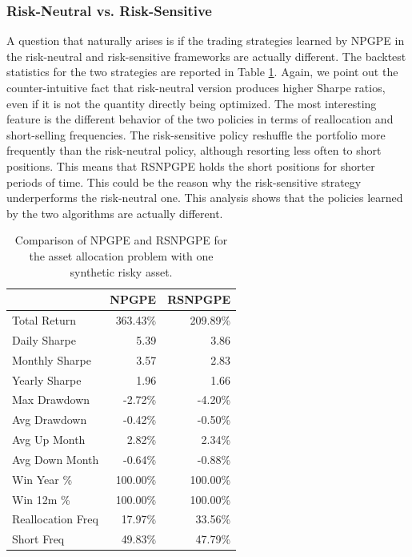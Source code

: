 \subsubsection{Risk-Neutral vs. Risk-Sensitive}
A question that naturally arises is if the trading strategies learned by \gls{NPGPE} in the risk-neutral and risk-sensitive frameworks are actually different. The backtest statistics for the two strategies are reported in Table \ref{tab:comparison_NPGPE}. Again, we point out the counter-intuitive fact that risk-neutral version produces higher Sharpe ratios, even if it is not the quantity directly being optimized. The most interesting feature is the different behavior of the two policies in terms of reallocation and short-selling frequencies. The risk-sensitive policy reshuffle the portfolio more frequently than the risk-neutral policy, although resorting less often to short positions. This means that \gls{RSNPGPE} holds the short positions for shorter periods of time. This could be the reason why the risk-sensitive strategy underperforms the risk-neutral one. This analysis shows that the policies learned by the two algorithms are actually different.

\begin{table}[t!]
\centering
\begin{tabular}{@{}lrr@{}}
\toprule
                  & \multicolumn{1}{c}{NPGPE} & \multicolumn{1}{c}{RSNPGPE} \\ \midrule
Total Return      & 363.43\%                  & 209.89\%                    \\
Daily Sharpe      & 5.39                      & 3.86                        \\
Monthly Sharpe    & 3.57                      & 2.83                        \\
Yearly Sharpe     & 1.96                      & 1.66                        \\
Max Drawdown      & -2.72\%                   & -4.20\%                     \\
Avg Drawdown      & -0.42\%                   & -0.50\%                     \\
Avg Up Month      & 2.82\%                    & 2.34\%                      \\
Avg Down Month    & -0.64\%                   & -0.88\%                     \\
Win Year \%       & 100.00\%                  & 100.00\%                    \\
Win 12m \%        & 100.00\%                  & 100.00\%                    \\
Reallocation Freq & 17.97\%                   & 33.56\%                     \\
Short Freq        & 49.83\%                   & 47.79\%                     \\ \bottomrule
\end{tabular}
\caption[Risk-neutral vs. risk-sensitive for a synthetic asset.]{Comparison of NPGPE and RSNPGPE for the asset allocation problem with one synthetic risky asset.}
\label{tab:comparison_NPGPE}
\end{table}

